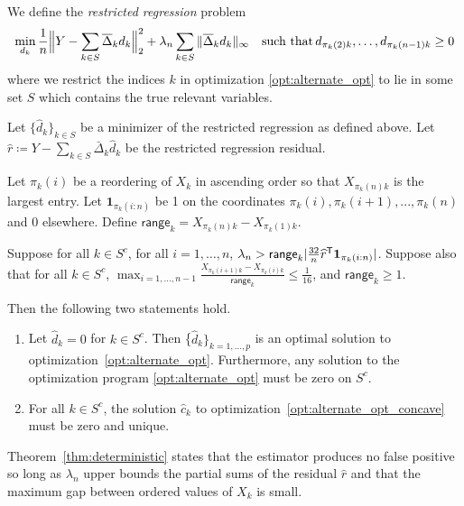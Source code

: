\begin{definition}
\label{def:restricted_regression}
We define the \emph{restricted regression} problem 
\[
\min_{d_k} \frac{1}{n} \Big\| Y - \sum_{k \in S} \overline{\Delta}_k d_k \Big\|_2^2 + 
   \lambda_n \sum_{k \in S} \| \overline{\Delta}_k d_k \|_\infty \quad \textrm{such that} \, d_{\pi_k(2)k}, \ldots, d_{\pi_k(n-1)k} \geq 0
\]
where we restrict the indices $k$ in
optimization \eqref{opt:alternate_opt} to lie in some set $S$ which contains the true
relevant variables.
\end{definition}



\begin{theorem}
\label{thm:deterministic}
Let $\{\hat{d}_k \}_{k \in S}$ be a minimizer of the restricted regression as defined above.
Let $\hat{r} \coloneqq Y - \sum_{k \in S} \bar{\Delta}_k \hat{d}_k$ be the restricted regression residual. 

Let $\pi_k(i)$ be a reordering of $X_k$ in ascending order so that $X_{\pi_k(n)k}$ is the largest entry. Let $\mathbf{1}_{\pi_k(i:n)}$ be 1 on the coordinates $\pi_k(i),\pi_k(i+1),...,\pi_k(n)$ and 0 elsewhere. Define $\mathsf{range}_k = X_{\pi_k(n)k} - X_{\pi_k(1)k}$.

Suppose for all $k\in S^c$, for all $i=1,\ldots,n$, $\lambda_n > \mathsf{range}_k| \frac{32}{n} \widehat{r}^{\mathsf{T}} \mbox{\boldmath $1$}_{\pi_k(i:n)}|$. Suppose also that for all $k \in S^c$, $\max_{i=1,...,n-1} \frac{X_{\pi_k(i+1)k} - X_{\pi_k(i)k}}{\mathsf{range}_k} \leq \frac{1}{16}$, and $\mathsf{range}_k \geq 1$.

Then the following two statements hold.
\begin{enumerate}
\item Let $\hat{d}_k = 0$ for $k \in S^c$.  Then
  \{$\hat{d}_k\}_{k=1,\ldots,p}$ is an optimal solution to
  optimization~\eqref{opt:alternate_opt}. Furthermore, any solution to
  the optimization program \eqref{opt:alternate_opt} must be zero on
  $S^c$.
\item For all $k \in S^c$, the solution $\hat{c}_k$ to optimization~\eqref{opt:alternate_opt_concave} must be zero and unique.
\end{enumerate}

\end{theorem}

Theorem~\ref{thm:deterministic} states that the estimator produces no
false positive so long as $\lambda_n$ upper bounds the partial sums of
the residual $\hat{r}$ and that the maximum gap between ordered values
of $X_k$ is small.

